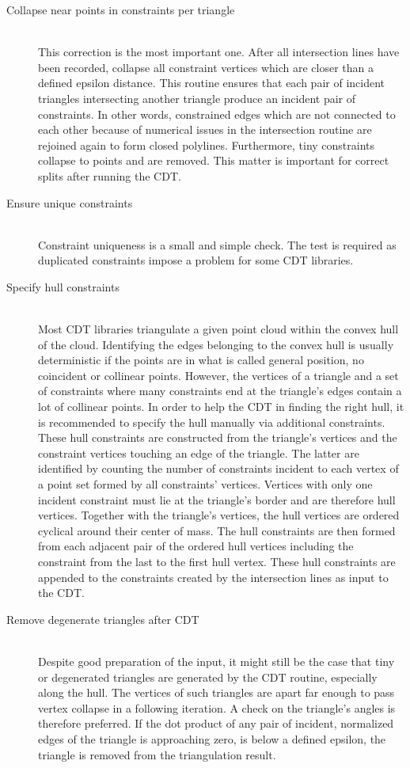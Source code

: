 \begin{description}
	
	\item[Collapse near points in constraints per triangle] \hfill \\
	This correction is the most important one.
	After all intersection lines have been recorded, collapse all constraint vertices which are closer than a defined epsilon distance.
	This routine ensures that each pair of incident triangles intersecting another triangle produce an incident pair of constraints.
	In other words, constrained edges which are not connected to each other because of numerical issues in the intersection routine are rejoined again to form closed polylines.
	Furthermore, tiny constraints collapse to points and are removed.
	This matter is important for correct splits after running the CDT.
	
	
	\item[Ensure unique constraints] \hfill \\
	Constraint uniqueness is a small and simple check.
	The test is required as duplicated constraints impose a problem for some CDT libraries.
	
	
	\item[Specify hull constraints] \hfill \\
	Most CDT libraries triangulate a given point cloud within the convex hull of the cloud.
	Identifying the edges belonging to the convex hull is usually deterministic if the points are in what is called general position, \ie no coincident or collinear points.
	However, the vertices of a triangle and a set of constraints where many constraints end at the triangle's edges contain a lot of collinear points.
	In order to help the CDT in finding the right hull, it is recommended to specify the hull manually via additional constraints.
	These hull constraints are constructed from the triangle's vertices and the constraint vertices touching an edge of the triangle.
	The latter are identified by counting the number of constraints incident to each vertex of a point set formed by all constraints' vertices.
	Vertices with only one incident constraint must lie at the triangle's border and are therefore hull vertices.
	Together with the triangle's vertices, the hull vertices are ordered cyclical around their center of mass.
	The hull constraints are then formed from each adjacent pair of the ordered hull vertices including the constraint from the last to the first hull vertex.
	These hull constraints are appended to the constraints created by the intersection lines as input to the CDT.
	
	
	\item[Remove degenerate triangles after CDT] \hfill \\
	Despite good preparation of the input, it might still be the case that tiny or degenerated triangles are generated by the CDT routine, especially along the hull.
	The vertices of such triangles are apart far enough to pass vertex collapse in a following iteration.
	A check on the triangle's angles is therefore preferred.
	If the dot product of any pair of incident, normalized edges of the triangle is approaching zero, \ie is below a defined epsilon, the triangle is removed from the triangulation result.
\end{description}


